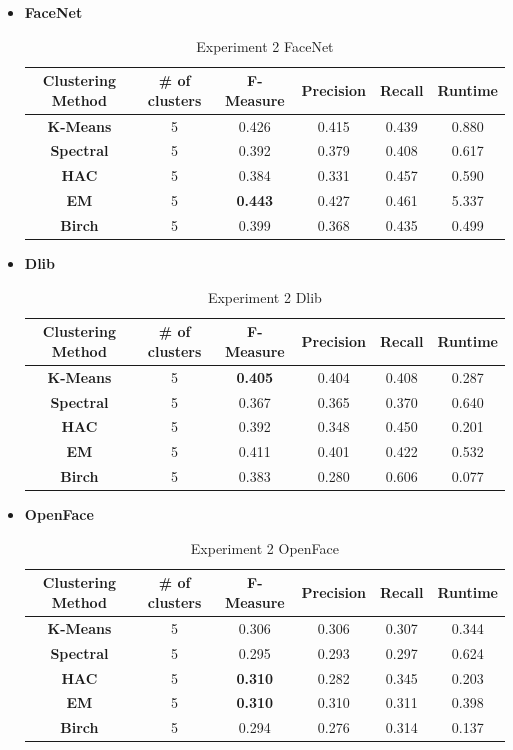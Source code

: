 \documentclass[12pt,english]{article}
\begin{document}
\begin{itemize}

\item \textbf{FaceNet}
\begin{table}[H]
\centering
\begin{tabular}{||c c c c c c||} 
 \hline
 Clustering Method & \# of clusters & F-Measure & Precision & Recall & Runtime\\ [0.5ex]
 \hline\hline
 \textbf{K-Means} & 5 & 0.426 & 0.415 & 0.439 & 0.880\\ 
 \hline
  \textbf{Spectral} & 5 & 0.392 & 0.379 & 0.408 & 0.617\\
 \hline
 \textbf{HAC} & 5 & 0.384 & 0.331 & 0.457 & 0.590\\
 \hline
 \textbf{EM} & 5 & \textbf{0.443} & 0.427 & 0.461 & 5.337\\
 \hline
 \textbf{Birch} & 5 & 0.399 & 0.368 & 0.435 & 0.499\\
 \hline
\end{tabular}
\caption{Experiment 2 FaceNet}
\label{table:ex2facenet}
\end{table}

\item \textbf{Dlib}
\begin{table}[H]
\centering
\begin{tabular}{||c c c c c c||} 
 \hline
 Clustering Method & \# of clusters & F-Measure & Precision & Recall & Runtime\\ [0.5ex]
 \hline\hline
 \textbf{K-Means} & 5 & \textbf{0.405} & 0.404 & 0.408 & 0.287\\ 
 \hline
  \textbf{Spectral} & 5 & 0.367 & 0.365 & 0.370 & 0.640\\
 \hline
 \textbf{HAC} & 5 & 0.392 & 0.348 & 0.450 & 0.201\\
 \hline
 \textbf{EM} & 5 & 0.411 & 0.401 & 0.422 & 0.532\\
 \hline
 \textbf{Birch} & 5 & 0.383 & 0.280 & 0.606 & 0.077\\
 \hline
\end{tabular}
\caption{Experiment 2 Dlib}
\label{table:ex2dlib}
\end{table}

\item \textbf{OpenFace}
\begin{table}[H]
\centering
\begin{tabular}{||c c c c c c||} 
 \hline
 Clustering Method & \# of clusters & F-Measure & Precision & Recall & Runtime\\ [0.5ex]
 \hline\hline
 \textbf{K-Means} & 5 & 0.306 & 0.306 & 0.307 & 0.344\\ 
 \hline
  \textbf{Spectral} & 5 & 0.295 & 0.293 & 0.297 & 0.624\\
 \hline
 \textbf{HAC} & 5 & \textbf{0.310} & 0.282 & 0.345 & 0.203\\
 \hline
 \textbf{EM} & 5 & \textbf{0.310} & 0.310 & 0.311 & 0.398\\
 \hline
 \textbf{Birch} & 5 & 0.294 & 0.276 & 0.314 & 0.137\\
 \hline
\end{tabular}
\caption{Experiment 2 OpenFace}
\label{table:ex2openface}
\end{table}


\end{itemize}
\end{document}
